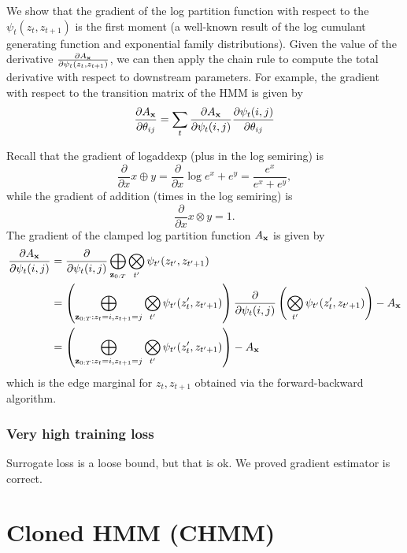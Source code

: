 \documentclass[12pt]{article}
\begin{document}
We show that the gradient of the log partition function with respect to the $\psi_t(z_t, z_{t+1})$
is the first moment (a well-known result of the log cumulant generating function
and exponential family distributions). Given the value of the derivative
$\frac{\partial A_{\mathbf{x}}}{\partial \psi_t(z_t, z_{t+1})}$,
we can then apply the chain rule to compute the total derivative with respect to
downstream parameters. For example, the gradient with respect to the transition matrix
of the HMM is given by
$$\frac{\partial A_{\mathbf{x}}}{\partial \theta_{ij}}
= \sum_t \frac{\partial A_{\mathbf{x}}}{\partial \psi_t(i,j)}
\frac{\partial \psi_t(i,j)}{\partial \theta_{ij}}$$

Recall that the gradient of logaddexp (plus in the log semiring) is
$$\frac{\partial}{\partial x} x \oplus y
= \frac{\partial}{\partial x} \log e^x + e^ y = \frac{e^x}{e^x + e^y},$$
while the gradient of addition (times in the log semiring) is
$$\frac{\partial}{\partial x} x \otimes y = 1.$$
The gradient of the clamped log partition function $A_{\mathbf{x}}$ is given by
\begin{align*}
\frac{\partial A_{\mathbf{x}}}{\partial \psi_t(i,j)}
&= \frac{\partial}{\partial \psi_t(i,j)} \bigoplus_{\mathbf{z}_{0:T}}
    \bigotimes_{t'} \psi_{t'}(z_{t'}, z_{t'+1})\\
&= \left(\bigoplus_{\mathbf{z}_{0:T}:z_t = i, z_{t+1} = j} 
    \bigotimes_{t'} \psi_{t'}(z_{t}', z_{t'+1})\right)
    \frac{\partial}{\partial \psi_t(i,j)}\left(\bigotimes_{t'} \psi_{t'}(z_{t}', z_{t'+1})\right) - A_{\mathbf{x}}\\
&= \left(\bigoplus_{\mathbf{z}_{0:T}:z_t = i, z_{t+1} = j} 
    \bigotimes_{t'} \psi_{t'}(z_{t}', z_{t'+1})\right)
    - A_{\mathbf{x}}
\end{align*} 
which is the edge marginal for $z_t, z_{t+1}$ obtained via the forward-backward algorithm.

\subsubsection{Very high training loss}
Surrogate loss is a loose bound, but that is ok.
We proved gradient estimator is correct.

\section{Cloned HMM (CHMM)}


%
%
\end{document}
